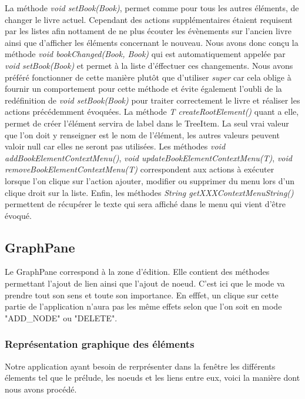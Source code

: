 				La méthode \textit{void setBook(Book)}, permet comme pour tous les autres éléments, de changer le livre actuel. Cependant des actions supplémentaires étaient requisent par les listes afin nottament de ne plus écouter les évènements sur l'ancien livre ainsi que d'afficher les éléments concernant le nouveau. Nous avons donc conçu la méthode \textit{void bookChanged(Book, Book)} qui est automatiquement appelée par \textit{void setBook(Book)} et permet à la liste d'éffectuer ces changements. Nous avons préféré fonctionner de cette manière plutôt que d'utiliser \textit{super} car cela oblige à fournir un comportement pour cette méthode et évite également l'oubli de la redéfinition de \textit{void setBook(Book)} pour traiter correctement le livre et réaliser les actions précédemment évoquées. La méthode \textit{T createRootElement()} quant a elle, permet de créer l'élément servira de label dans le TreeItem. La seul vrai valeur que l'on doit y renseigner est le nom de l'élément, les autres valeurs peuvent valoir null car elles ne seront pas utilisées. Les méthodes \textit{void addBookElementContextMenu()}, \textit{void updateBookElementContextMenu(T)}, \textit{void removeBookElementContextMenu(T)} correspondent aux actions à exécuter lorsque l'on clique sur l'action ajouter, modifier ou supprimer du menu lors d'un clique droit sur la liste. Enfin, les méthodes \textit{String getXXXContextMenuString()} permettent de récupérer le texte qui sera affiché dans le menu qui vient d'être évoqué.

		\subsection{GraphPane}
			\label{sub:GraphPane}

			Le GraphPane correspond à la zone d'édition. Elle contient des méthodes permettant l'ajout de lien ainsi que l'ajout de noeud. C'est ici que le mode va prendre tout son sens et toute son importance. En efffet, un clique sur cette partie de l'application n'aura pas les même effets selon que l'on soit en mode "ADD\_NODE" ou "DELETE".

			\subsubsection{Représentation graphique des éléments}

				Notre application ayant besoin de rerprésenter dans la fenêtre les différents élements tel que le prélude, les noeuds et les liens entre eux, voici la manière dont nous avons procédé.

